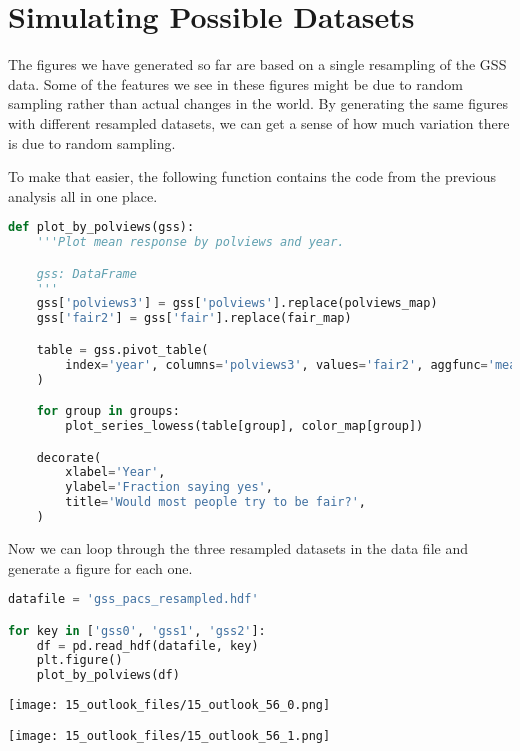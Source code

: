 \pagebreak

\section{Simulating Possible
Datasets}\label{simulating-possible-datasets}

The figures we have generated so far are based on a single resampling of
the GSS data. Some of the features we see in these figures might be due
to random sampling rather than actual changes in the world. By
generating the same figures with different resampled datasets, we can
get a sense of how much variation there is due to random sampling.

To make that easier, the following function contains the code from the
previous analysis all in one place.

\begin{lstlisting}[language=Python,style=source]
def plot_by_polviews(gss):
    '''Plot mean response by polviews and year.

    gss: DataFrame
    '''
    gss['polviews3'] = gss['polviews'].replace(polviews_map)
    gss['fair2'] = gss['fair'].replace(fair_map)

    table = gss.pivot_table(
        index='year', columns='polviews3', values='fair2', aggfunc='mean'
    )

    for group in groups:
        plot_series_lowess(table[group], color_map[group])

    decorate(
        xlabel='Year',
        ylabel='Fraction saying yes',
        title='Would most people try to be fair?',
    )
\end{lstlisting}

Now we can loop through the three resampled datasets in the data file
and generate a figure for each one.

\begin{lstlisting}[language=Python,style=source]
datafile = 'gss_pacs_resampled.hdf'

for key in ['gss0', 'gss1', 'gss2']:
    df = pd.read_hdf(datafile, key)
    plt.figure()
    plot_by_polviews(df)
\end{lstlisting}

\begin{center}
\texttt{[image: 15\_outlook\_files/15\_outlook\_56\_0.png]}
\end{center}

\begin{center}
\texttt{[image: 15\_outlook\_files/15\_outlook\_56\_1.png]}
\end{center}


